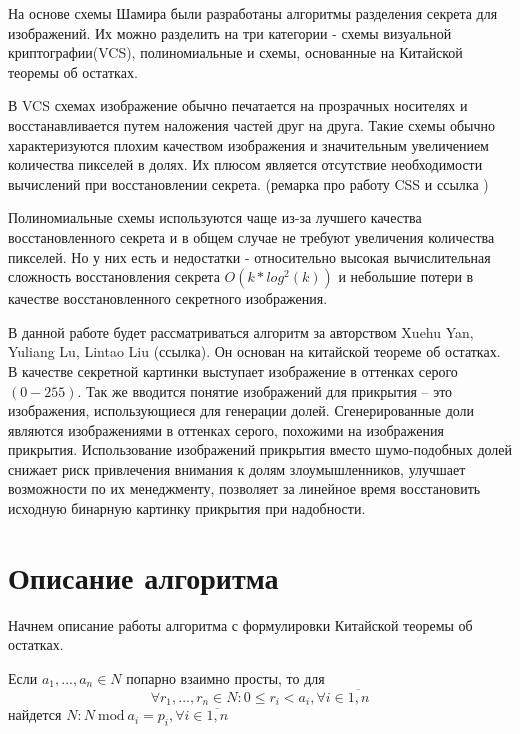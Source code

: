 \documentclass[a4paper,article,14pt]{extarticle}
\newcommand{\Mod}[1]{\ \mathrm{mod}\ #1}
\begin{document}
На основе схемы Шамира были разработаны алгоритмы разделения секрета для изображений. Их можно разделить на три категории - схемы 
визуальной криптографии(VCS), полиномиальные и схемы, основанные на Китайской теоремы об остатках. 

В VCS схемах изображение обычно печатается на прозрачных носителях и восстанавливается путем наложения частей друг на друга. Такие 
схемы обычно характеризуются плохим качеством изображения и значительным увеличением количества пикселей в долях. Их плюсом является
отсутствие необходимости вычислений при восстановлении секрета. (ремарка про работу CSS и ссылка )

Полиномиальные схемы используются чаще из-за лучшего качества восстановленного секрета и в общем случае 
не требуют увеличения количества пикселей. Но у них есть и недостатки - относительно высокая вычислительная сложность 
восстановления секрета $O(k*log^2(k))$ и небольшие потери в качестве восстановленного секретного изображения.

В данной работе будет рассматриваться алгоритм за авторством Xuehu Yan, Yuliang Lu, Lintao Liu (ссылка). Он основан на китайской 
теореме об остатках. В качестве секретной картинки выступает изображение в оттенках серого $(0-255)$.
Так же вводится понятие изображений для прикрытия -- это изображения, использующиеся для генерации долей. Сгенерированные доли 
являются изображениями в оттенках серого, похожими на изображения прикрытия. Использование изображений прикрытия 
вместо шумо-подобных долей снижает риск привлечения внимания к долям злоумышленников, улучшает возможности 
по их менеджменту, позволяет за линейное время восстановить исходную бинарную картинку прикрытия при надобности. 

\newpage
\section{Описание алгоритма}
Начнем описание работы алгоритма с формулировки Китайской теоремы об остатках.

Если $ a_1,...,a_n \in N $ попарно взаимно просты, то для 
$$\forall r_1,...,r_n \in N : 0\leq r_i<a_i, \forall i\in \overline{1,n}$$
найдется $N: N \Mod a_i = p_i, \forall i\in \overline{1,n}$ 
\end{document}
